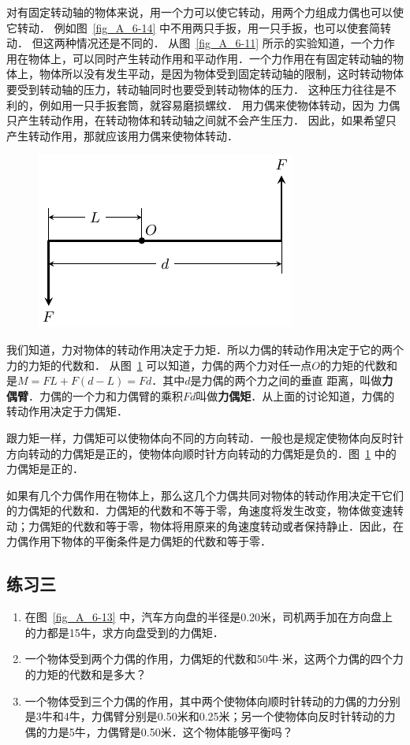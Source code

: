 对有固定转动轴的物体来说，用一个力可以使它转动，用两个力组成力偶也可以使它转动．
例如图~\ref{fig_A_6-14} 中不用两只手扳，用一只手扳，也可以使套简转动．
但这两种情况还是不同的．
从图~\ref{fig_A_6-11} 所示的实验知道，一个力作用在物体上，可以同时产生转动作用和平动作用．一个力作用在有固定转动轴的物体上，物体所以没有发生平动，是因为物体受到固定转动轴的限制，这时转动物体要受到转动轴的压力，转动轴同时也要受到转动物体的压力．
这种压力往往是不利的，例如用一只手扳套筒，就容易磨损螺纹．
用力偶来使物体转动，因为
力偶只产生转动作用，在转动物体和转动轴之间就不会产生压力．
因此，如果希望只产生转动作用，那就应该用力偶来使物体转动．
\begin{figure}[htbp]
    \centering
    \includegraphics{fig/A/6-15.pdf}
    \caption{}\label{fig_A_6-15}
\end{figure}

我们知道，力对物体的转动作用决定于力矩．所以力偶的转动作用决定于它的两个力的力矩的代数和．
从图~\ref{fig_A_6-15} 可以知道，力偶的两个力对任一点$O$的力矩的代数和是$M=FL+F(d-L)=Fd$．其中$d$是力偶的两个力之间的垂直
距离，叫做\textbf{力偶臂}．力偶的一个力和力偶臂的乘积$Fd$叫做\textbf{力偶矩}．从上面的讨论知道，力偶的转动作用决定于力偶矩．

跟力矩一样，力偶矩可以使物体向不同的方向转动．一般也是规定使物体向反时针方向转动的力偶矩是正的，使物体向顺时针方向转动的力偶矩是负的．图~\ref{fig_A_6-15} 中的力偶矩是正的．




如果有几个力偶作用在物体上，那么这几个力偶共同对物体的转动作用决定干它们的力偶矩的代数和．力偶矩的代数和不等于零，角速度将发生改变，物体做变速转动；力偶矩的代数和等于零，物体将用原来的角速度转动或者保持静止．因此，在力偶作用下物体的平衡条件是力偶矩的代数和等于零．

\subsection*{练习三}
\begin{enumerate}
    \item 在图~\ref{fig_A_6-13} 中，汽车方向盘的半径是0.20米，司机两手加在方向盘上的力都是15牛，求方向盘受到的力偶矩．
    \item 一个物体受到两个力偶的作用，力偶矩的代数和50牛$\cdot$米，这两个力偶的四个力的力矩的代数和是多大？
    \item 一个物体受到三个力偶的作用，其中两个使物体向顺时针转动的力偶的力分别是3牛和4牛，力偶臂分别是0.50米和0.25米；另一个使物体向反时针转动的力偶的力是5牛，力偶臂是0.50米．这个物体能够平衡吗？
\end{enumerate}

